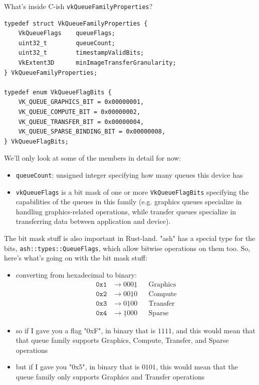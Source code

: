 \documentclass[12pt,letterpaper]{article}
\newcommand{\ril}[1]{\texttt{#1}}
\newcommand{\cil}[1]{\texttt{#1}}
\begin{document}
		What's inside C-ish \cil{vkQueueFamilyProperties}?
	\begin{verbatim}
typedef struct VkQueueFamilyProperties {
	VkQueueFlags    queueFlags;
	uint32_t        queueCount;
	uint32_t        timestampValidBits;
	VkExtent3D      minImageTransferGranularity;
} VkQueueFamilyProperties;

typedef enum VkQueueFlagBits {
	VK_QUEUE_GRAPHICS_BIT = 0x00000001,
	VK_QUEUE_COMPUTE_BIT = 0x00000002,
	VK_QUEUE_TRANSFER_BIT = 0x00000004,
	VK_QUEUE_SPARSE_BINDING_BIT = 0x00000008,
} VkQueueFlagBits;
	\end{verbatim}
	
		We'll only look at some of the members in detail for now:
			\begin{itemize}
				\item \cil{queueCount}: unsigned integer specifying how many queues this device has 
				\item \cil{vkQueueFlags} is a bit mask of one or more \cil{VkQueueFlagBits} specifying the capabilities of the queues in this family (e.g. graphics queues specialize in handling graphics-related operations, while transfer queues specialize in transferring data between application and device).
			\end{itemize}
		
		The bit mask stuff is also important in Rust-land. "ash" has a special type for the bits, \ril{ash::types::QueueFlags}, which allow bitwise operations on them too. So, here's what's going on with the bit mask stuff:
			\begin{itemize}
				\item converting from hexadecimal to binary:
					\begin{align*}
						\mathtt{0x1} &\rightarrow 000\underline{1} && \text{Graphics}\\
						\mathtt{0x2} &\rightarrow 00\underline{1}0 && \text{Compute}\\
						\mathtt{0x3} &\rightarrow 0\underline{1}00 && \text{Transfer}\\
						\mathtt{0x4} &\rightarrow \underline{1}000 && \text{Sparse}
					\end{align*}
				
				\item so if I gave you a flag "0xF", in binary that is $1111$, and this would mean that that queue family supports Graphics, Compute, Transfer, and Sparse operations
				
				\item but if I gave you "0x5", in binary that is $0101$, this would mean that the queue family only supports Graphics and Transfer operations
			\end{itemize}
		
\end{document}

